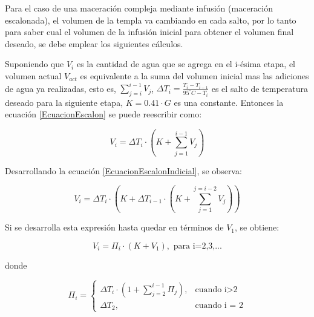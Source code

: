\begin{itemize}
                \par Para el caso de una maceración compleja mediante infusión (maceración escalonada), el volumen de la templa va cambiando en cada salto, por lo tanto para saber cual el volumen de la infusión inicial para obtener el volumen final deseado, se debe emplear los siguientes cálculos.
                
                \par Suponiendo que $V_i$ es la cantidad de agua que se agrega en el i-ésima etapa, el volumen actual $V_{act}$ es equivalente a la suma del volumen inicial mas las adiciones de agua ya realizadas, esto es, $\sum_{j=i}^{i-1} V_j$, $\Delta T_{i} = \frac{T_i - T_{i-1}}{95^{\circ}C - T_i}$ es el salto de temperatura deseado para la siguiente etapa,  $K=0.41 \cdot G$ es una constante. Entonces la ecuación \ref{EcuacionEscalon} se puede reescribir como:
                
                \begin{equation}
                    V_{i} = \Delta T_{i} \cdot (K + \sum_{j=1}^{i-1} V_j )
                    \label{EcuacionEscalonIndicial}
                \end{equation}
                
                \par Desarrollando la ecuación \ref{EcuacionEscalonIndicial}, se observa:
                
                \begin{equation}
                    V_{i} = \Delta T_{i} \cdot (K + \Delta T_{i-1} \cdot (K + \sum_{j=1}^{j = i-2} V_j))
                \end{equation}
                
                \par Si se desarrolla esta expresión hasta quedar en términos de $V_1$, se obtiene:
                
                \begin{equation}
                    V_i = \Pi_i \cdot(K + V_1), \text{ para i=2,3,...}
                \label{EcuacionEscalonadaPi}
                \end{equation}
                \par donde
                
                $$ \Pi_i = 
                \begin{cases}
                \Delta T_i \cdot (1 + \sum_{j=2}^{i-1} \Pi_j), & \text{cuando i>2} \\
                \Delta T_2, & \text{cuando i = 2}
                \end{cases}
                $$
                

\end{itemize}
